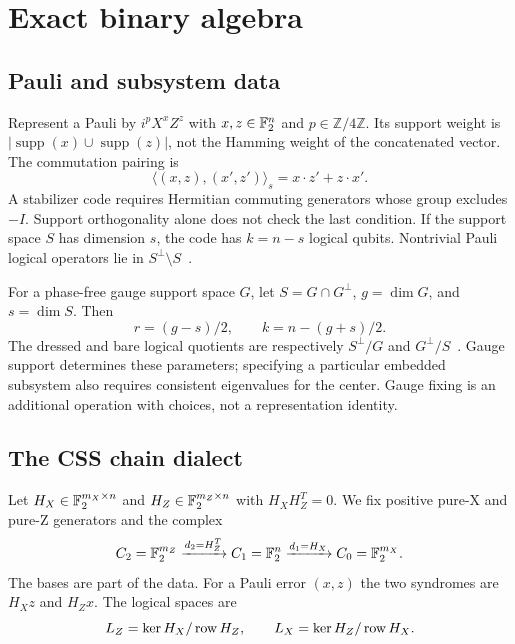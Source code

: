 \section{Exact binary algebra}

\subsection{Pauli and subsystem data}
Represent a Pauli by $i^p X^x Z^z$ with $x,z\in\mathbb{F}_2^n$ and
$p\in\mathbb Z/4\mathbb Z$. Its support weight is
$|\operatorname{supp}(x)\cup\operatorname{supp}(z)|$, not the Hamming
weight of the concatenated vector. The commutation pairing is
\begin{equation}
 \langle(x,z),(x',z')\rangle_s=x\cdot z'+z\cdot x'.
\end{equation}
A stabilizer code requires Hermitian commuting generators whose group
excludes $-I$. Support orthogonality alone does not check the last
condition. If the support space $S$ has dimension $s$, the code has
$k=n-s$ logical qubits. Nontrivial Pauli logical operators lie in
$S^\perp\setminus S$~\cite{gottesman1997}.

For a phase-free gauge support space $G$, let $S=G\cap G^\perp$,
$g=\dim G$, and $s=\dim S$. Then
\begin{equation}
 r=(g-s)/2,\qquad k=n-(g+s)/2.
\end{equation}
The dressed and bare logical quotients are respectively
$S^\perp/G$ and $G^\perp/S$~\cite{poulin2005}. Gauge support determines
these parameters; specifying a particular embedded subsystem also requires
consistent eigenvalues for the center. Gauge fixing is an additional
operation with choices, not a representation identity.

\subsection{The CSS chain dialect}
Let $H_X\in\mathbb{F}_2^{m_X\times n}$ and $H_Z\in\mathbb{F}_2^{m_Z\times n}$ with
$H_XH_Z^T=0$. We fix positive pure-X and pure-Z generators and the complex
\begin{equation}
 C_2=\mathbb{F}_2^{m_Z}\xrightarrow{d_2=H_Z^T}
 C_1=\mathbb{F}_2^n\xrightarrow{d_1=H_X}C_0=\mathbb{F}_2^{m_X}.
\end{equation}
The bases are part of the data. For a Pauli error $(x,z)$ the two
syndromes are $H_Xz$ and $H_Zx$. The logical spaces are
\begin{equation}
 L_Z=\ker H_X/\operatorname{row} H_Z,\qquad
 L_X=\ker H_Z/\operatorname{row} H_X.
\end{equation}

